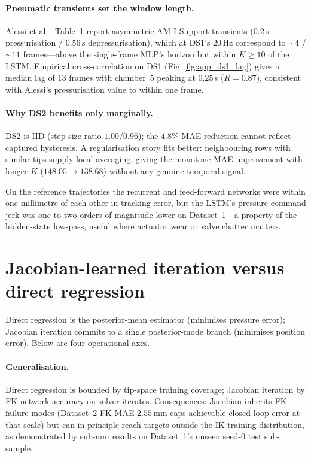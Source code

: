 \paragraph{Pneumatic transients set the window length.}
Alessi et al.\ \cite{alessi2024pushing} Table~1 report asymmetric AM-I-Support transients ($0.2$\,s pressurisation / $0.56$\,s depressurisation), which at DS1's $20$\,Hz correspond to $\sim$$4$ / $\sim$$11$ frames---above the single-frame MLP's horizon but within $K \geq 10$ of the LSTM. Empirical cross-correlation on DS1 (Fig~\ref{fig:app_ds1_lag}) gives a median lag of $13$ frames with chamber~$5$ peaking at $0.25$\,s ($R = 0.87$), consistent with Alessi's pressurisation value to within one frame.

\paragraph{Why DS2 benefits only marginally.}
DS2 is IID (step-size ratio $1.00$/$0.96$); the $4.8\%$ MAE reduction cannot reflect captured hysteresis. A regularisation story fits better: neighbouring rows with similar tips supply local averaging, giving the monotone MAE improvement with longer $K$ ($148.05 \to 138.68$) without any genuine temporal signal.

On the reference trajectories the recurrent and feed-forward networks were within one millimetre of each other in tracking error, but the LSTM's pressure-command jerk was one to two orders of magnitude lower on Dataset~1---a property of the hidden-state low-pass, useful where actuator wear or valve chatter matters.

\section{Jacobian-learned iteration versus direct regression}
\label{sec:disc_jacobian_vs_mlp}

Direct regression is the posterior-mean estimator (minimises pressure error); Jacobian iteration commits to a single posterior-mode branch (minimises position error). Below are four operational axes.

\paragraph{Generalisation.}
Direct regression is bounded by tip-space training coverage; Jacobian iteration by FK-network accuracy on solver iterates. Consequences: Jacobian inherits FK failure modes (Dataset~2 FK MAE $2.55$\,mm caps achievable closed-loop error at that scale) but can in principle reach targets outside the IK training distribution, as demonstrated by sub-mm results on Dataset~1's unseen seed-0 test sub-sample.

